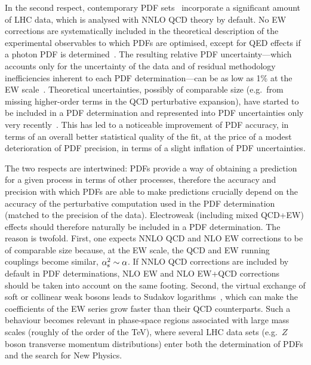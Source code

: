 In the second respect, contemporary PDF
sets~\cite{Harland-Lang:2014zoa,Ball:2017nwa,Hou:2019efy}
incorporate a significant amount of LHC data, which is analysed with NNLO QCD 
theory by default. No EW corrections are systematically included in the 
theoretical description of the experimental observables to which PDFs are 
optimised, except for QED effects if a photon PDF is 
determined~\cite{Schmidt:2015zda,Bertone:2017bme,Harland-Lang:2019pla}. 
The resulting relative PDF uncertainty---which accounts only for the
uncertainty of the data and of residual methodology inefficiencies inherent to 
each PDF determination---can be as low as 1\% at the EW
scale~\cite{Ball:2017nwa}. Theoretical uncertainties, possibly of comparable 
size (e.g.\ from missing higher-order terms in the QCD perturbative
expansion), have started to be included in a PDF determination and represented 
into PDF uncertainties only very 
recently~\cite{AbdulKhalek:2019bux,AbdulKhalek:2019ihb}. This has led to a 
noticeable improvement of PDF accuracy, in terms of an overall
better statistical quality of the fit, at the price of a modest deterioration 
of PDF precision, in terms of a slight inflation of PDF uncertainties.

The two respects are intertwined: PDFs provide a way of obtaining a prediction
for a given process in terms of other processes, therefore the accuracy and 
precision with which PDFs are able to make predictions crucially depend on 
the accuracy of the perturbative computation used in the PDF determination
(matched to the precision of the data). Electroweak (including mixed QCD+EW) 
effects should therefore naturally be included in a PDF determination. The 
reason is twofold. First, one expects NNLO QCD and NLO EW corrections to be of 
comparable size because, at the EW scale, the QCD and EW running couplings 
become similar, $\alpha_\mathrm{s}^2\sim \alpha$. If NNLO QCD corrections are included
by default in PDF determinations, NLO EW and NLO EW+QCD corrections should be 
taken into account on the same footing. Second, the virtual exchange of soft or 
collinear weak bosons leads to Sudakov 
logarithms~\cite{Denner:2000jv,Denner:2001gw},
which can make the coefficients of the EW series grow faster than 
their QCD counterparts. Such a behaviour becomes relevant in
phase-space regions associated with large mass scales (roughly of the order
of the \si{\tera\electronvolt}), where several LHC data sets (e.g.\ $Z$ boson transverse
momentum distributions) enter both the determination of PDFs and the search
for New Physics.


